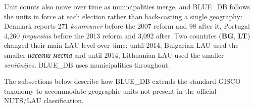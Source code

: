 
Unit counts also move over time as municipalities merge, and BLUE\_DB follows
the units in force at each election rather than back-casting a single
geography: Denmark reports 271 \textit{kommuner} before the 2007 reform and 98
after it, Portugal 4,260 \textit{freguesias} before the 2013 reform and
3,092 after. Two countries (\textbf{BG}, \textbf{LT}) changed their main LAU level
over time: until 2014, Bulgarian LAU used the smaller \emph{населни места}
and until 2014, Lithuanian LAU used the smaller \emph{seni\=unijos}. BLUE\_DB
uses municipalities throughout.

The subsections below describe how BLUE\_DB extends the standard GISCO taxonomy
to accommodate geographic units not present in the official NUTS/LAU
classification.
